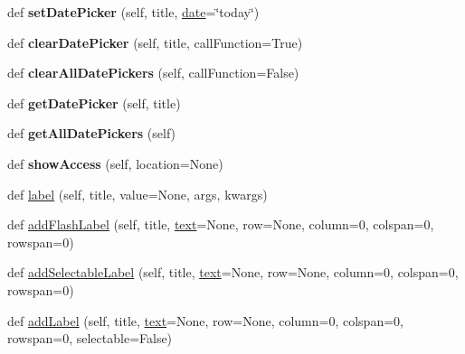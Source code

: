 \begin{DoxyCompactItemize}
\mbox{\label{class_python_01_g_u_i_1_1appjar_1_1gui_abcd3e8594640cc17b7c85d17fda56737}} 
def {\bfseries set\+Date\+Picker} (self, title, \hyperlink{class_python_01_g_u_i_1_1appjar_1_1gui_aaf78746829437a637aad1f56fa01efd1}{date}=\char`\"{}today\char`\"{})
\item 
\mbox{\label{class_python_01_g_u_i_1_1appjar_1_1gui_abda8e2b674c94a3c54b1bd17e2f923b2}} 
def {\bfseries clear\+Date\+Picker} (self, title, call\+Function=True)
\item 
\mbox{\label{class_python_01_g_u_i_1_1appjar_1_1gui_a337ccd96023658c7bf46f169aac7b056}} 
def {\bfseries clear\+All\+Date\+Pickers} (self, call\+Function=False)
\item 
\mbox{\label{class_python_01_g_u_i_1_1appjar_1_1gui_afc76bcf46a673cc1affad638d462a42d}} 
def {\bfseries get\+Date\+Picker} (self, title)
\item 
\mbox{\label{class_python_01_g_u_i_1_1appjar_1_1gui_a0b42b1a7a9c9a9b3f144e0df9f9a4db2}} 
def {\bfseries get\+All\+Date\+Pickers} (self)
\item 
\mbox{\label{class_python_01_g_u_i_1_1appjar_1_1gui_aa70ac484fc34716107bb88b89d778ee9}} 
def {\bfseries show\+Access} (self, location=None)
\item 
def \hyperlink{class_python_01_g_u_i_1_1appjar_1_1gui_a899e593dca96dd2a31035558b685e3bd}{label} (self, title, value=None, args, kwargs)
\item 
def \hyperlink{class_python_01_g_u_i_1_1appjar_1_1gui_a5ffc357a1387f8a01d331508d9614dc4}{add\+Flash\+Label} (self, title, \hyperlink{class_python_01_g_u_i_1_1appjar_1_1gui_a6a060ddfec169e464326a0dd179a559e}{text}=None, row=None, column=0, colspan=0, rowspan=0)
\item 
def \hyperlink{class_python_01_g_u_i_1_1appjar_1_1gui_a2f80b5878fe70e4ce66f4259eb36c8c1}{add\+Selectable\+Label} (self, title, \hyperlink{class_python_01_g_u_i_1_1appjar_1_1gui_a6a060ddfec169e464326a0dd179a559e}{text}=None, row=None, column=0, colspan=0, rowspan=0)
\item 
def \hyperlink{class_python_01_g_u_i_1_1appjar_1_1gui_a4e47ba29cb48ce5edee19d0f160dea44}{add\+Label} (self, title, \hyperlink{class_python_01_g_u_i_1_1appjar_1_1gui_a6a060ddfec169e464326a0dd179a559e}{text}=None, row=None, column=0, colspan=0, rowspan=0, selectable=False)

\end{DoxyCompactItemize}
